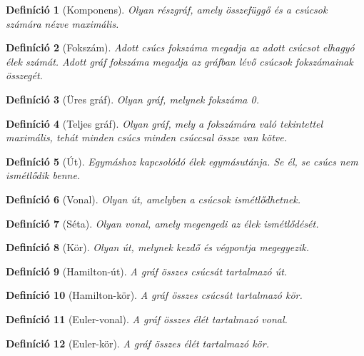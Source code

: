 \documentclass{article}
\newtheorem{definition}{Definíció}[section]
\begin{document}
\begin{definition}[Komponens]
    Olyan részgráf, amely összefüggő és a csúcsok számára nézve maximális.
\end{definition}

\begin{definition}[Fokszám]
    Adott csúcs fokszáma megadja az adott csúcsot elhagyó élek számát. Adott gráf fokszáma megadja az gráfban lévő csúcsok fokszámainak összegét.
\end{definition}

\begin{definition}[Üres gráf]
    Olyan gráf, melynek fokszáma 0.
\end{definition}

\begin{definition}[Teljes gráf]
    Olyan gráf, mely a fokszámára való tekintettel maximális, tehát minden csúcs minden csúccsal össze van kötve.
\end{definition}

\begin{definition}[Út]
    Egymáshoz kapcsolódó élek egymásutánja. Se él, se csúcs nem ismétlődik benne.
\end{definition}

\begin{definition}[Vonal]
    Olyan út, amelyben a csúcsok ismétlődhetnek.
\end{definition}

\begin{definition}[Séta]
    Olyan vonal, amely megengedi az élek ismétlődését.
\end{definition}

\begin{definition}[Kör]
    Olyan út, melynek kezdő és végpontja megegyezik.
\end{definition}

\begin{definition}[Hamilton-út]
    A gráf összes csúcsát tartalmazó út.
\end{definition}

\begin{definition}[Hamilton-kör]
    A gráf összes csúcsát tartalmazó kör.
\end{definition}

\begin{definition}[Euler-vonal]
    A gráf összes élét tartalmazó vonal.
\end{definition}

\begin{definition}[Euler-kör]
    A gráf összes élét tartalmazó kör.
\end{definition}
\end{document}
